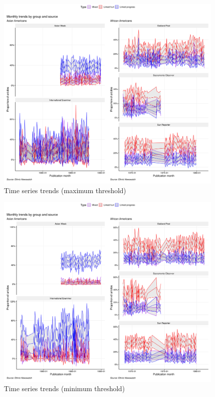 \documentclass[12 pt]{article}
\begin{document}
\begin{appendices}
\begin{figure}[htbp!]
    \centering
    \includegraphics[width=0.8\linewidth]{time_series_source.png}
    \caption{Time series trends (maximum threshold)}
    \label{fig:ts_max_source}
\end{figure}

\begin{figure}[htbp!]
    \centering
    \includegraphics[width=0.8\linewidth]{time_series_source_gran.png}
    \caption{Time series trends (minimum threshold)}
    \label{fig:ts_min_source}
\end{figure}

\clearpage

\end{appendices}
\end{document}
